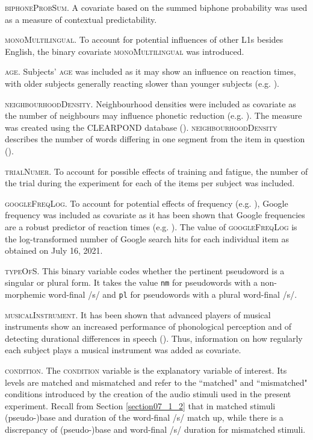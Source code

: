 \textsc{biphoneProbSum}. A covariate based on the summed biphone probability was used as a measure of contextual predictability.

\textsc{monoMultilingual}. To account for potential influences of other L1s besides English, the binary covariate \textsc{monoMultilingual} was introduced. 

\textsc{age}. Subjects’ \textsc{age} was included as it may show an influence on reaction times, with older subjects generally reacting slower than younger subjects (e.g. \cite{Fozard1994}).

\textsc{neighbourhoodDensity}. Neighbourhood densities were included as covariate as the number of neighbours may influence phonetic reduction (e.g. \cite{Gahl2012}). The measure was created using the CLEARPOND database (\cite{Marian2012}). \textsc{neighbourhoodDensity} describes the number of words differing in one segment from the item in question (\cite[3]{Marian2012}).

\textsc{trialNumer}. To account for possible effects of training and fatigue, the number of the trial during the experiment for each of the items per subject was included. 

\textsc{googleFreqLog}. To account for potential effects of frequency (e.g. \cite{Baayen2006, Keuleers2010, Brysbaert2011}), Google frequency was included as covariate as it has been shown that Google frequencies are a robust predictor of reaction times (e.g. \cite{Hendrix2020}). The value of \textsc{googleFreqLog} is the log-transformed number of Google search hits for each individual item as obtained on July 16, 2021.

\textsc{typeOfS}. This binary variable codes whether the pertinent pseudoword is a singular or plural form. It takes the value \texttt{nm} for pseudowords with a non-morphemic word-final /s/ and \texttt{pl} for pseudowords with a plural word-final /s/.

\textsc{musicalInstrument}. It has been shown that advanced players of musical instruments show an increased performance of phonological perception and of detecting durational differences in speech (\cite{Anvari2002, Milovanov2009}). Thus, information on how regularly each subject plays a musical instrument was added as covariate.

\textsc{condition}. The \textsc{condition} variable is the explanatory variable of interest. Its levels are matched and mismatched and refer to the ``matched" and ``mismatched" conditions introduced by the creation of the audio stimuli used in the present experiment. Recall from Section \ref{section07_1_2} that in matched stimuli (pseudo-)base and duration of the word-final /s/ match up, while there is a discrepancy of (pseudo-)base and word-final /s/ duration for mismatched stimuli. 

